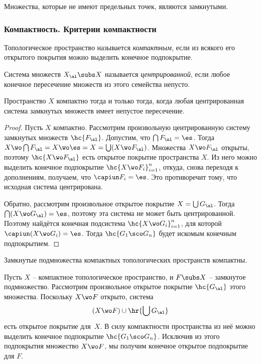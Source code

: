 \documentclass[a4paper]{article}
\begin{document}
\begin{imp}
Множества, которые не имеют предельных точек, являются замкнутыми.
\end{imp}


\subsubsection{Компактность. Критерии компактности}

\begin{df}
Топологическое пространство называется \emph{компактным}, если из всякого его открытого покрытия
можно выделить конечное подпокрытие.
\end{df}

\begin{df}
Система множеств $X_\al \subs X$ называется \emph{центрированной}, если любое конечное пересечение
множеств из этого семейства непусто.
\end{df}


\begin{theorem}
\label{th:comp.eq.cent.sys}
Пространство $X$ компактно тогда и только тогда, когда любая центрированная система замкнутых множеств имеет
непустое пересечение.
\end{theorem}
\begin{proof}
Пусть $X$ компактно. Рассмотрим произвольную центрированную систему замкнутых множеств $\hc{F_\al}$.
Допустим, что $\bigcap F_\al = \es$. Тогда
$X \wo \bigcap F_\al = X \wo \es = X = \bigcup (X \wo F_\al)$.
Множества $X \wo F_\al$ открыты, поэтому $\hc{X \wo F_\al}$ есть открытое покрытие пространства $X$.
Из него можно выделить конечное подпокрытие $\hc{X \wo F_i}_{i=1}^n$, откуда, снова переходя к дополнениям,
получаем, что $\capiun F_i = \es$. Это противоречит тому, что исходная система центрирована.

Обратно, рассмотрим произвольное открытое покрытие $X = \bigcup G_\al$.
Тогда $\bigcap (X \wo G_\al) = \es$,
поэтому эта система не может быть центрированной. Поэтому найдётся конечная подсистема $\hc{X \wo G_i}_{i=1}^n$,
для которой $\capiun (X \wo G_i) = \es$.
Тогда $\hc{G_1\sco G_n}$ будет искомым конечным подпокрытием.
\end{proof}

\begin{problem}
Замкнутые подмножества компактных топологических пространств компактны.
\end{problem}
\begin{solution}
Пусть $X$ -- компактное топологическое пространство, и $F \subs X$ -- замкнутое подмножество.
Рассмотрим произвольное открытое покрытие $\hc{G_\al}$ этого множества. Поскольку $X \wo F$ открыто,
система
$$(X \wo F) \cup \hr{\bigcup G_\al}$$
есть открытое покрытие для~$X$. В силу компактности пространства из неё можно выделить конечное подпокрытие
$\hc{G_1\sco G_n}$. Исключив из этого подпокрытия множество $X \wo F$, мы получим
конечное открытое подпокрытие для $F$.
\end{solution}
\end{document}
